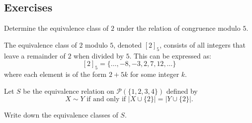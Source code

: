 \subsection{Exercises}

\begin{exercise}
		Determine the equivalence class of \( 2 \) under the relation of congruence modulo \( 5 \).
\end{exercise}
	\begin{solution}
		The equivalence class of \( 2 \) modulo \( 5 \), denoted \( [2]_5 \), consists of all integers that leave a remainder of \( 2 \) when divided by \( 5 \). This can be expressed as:
		\[ [2]_5 = \{ \ldots, -8, -3, 2, 7, 12, \ldots \} \]
		where each element is of the form \( 2 + 5k \) for some integer \( k \).
	\end{solution}

 
\begin{exercise}
Let $S$ be the equivalence relation on $\mathcal{P}(\{1, 2, 3, 4\})$ defined by 
\[
X \sim Y \text{ if and only if } |X \cup \{2\}| = |Y \cup \{2\}|.
\]

Write down the equivalence classes of $S$.
\end{exercise}

